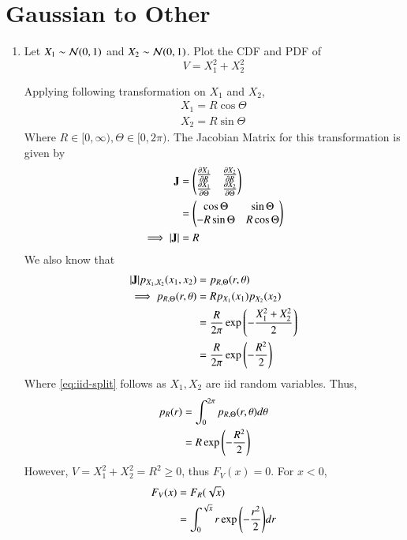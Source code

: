 \documentclass[journal,12pt,twocolumn]{IEEEtran}
\renewcommand\thesection{\arabic{section}}
\begin{document}
\section{Gaussian to Other}
%
\begin{enumerate}[label=\thesection.\arabic*,ref=\thesection.\theenumi]
%
\item Let $X_1 \sim  \mathcal{N}(0, 1)$ and $X_2 \sim  \mathcal{N}(0, 1)$. Plot the CDF and PDF of
%
\begin{equation}
V = X_1^2 + X_2^2
\end{equation}

\solution

Applying following transformation on $X_1$ and $X_2$,
\begin{align}
	X_1 = R\cos{\Theta} \\
	X_2 = R\sin{\Theta}
\end{align}
Where $R \in [0, \infty), \Theta \in [0, 2\pi)$. The Jacobian Matrix for this transformation is given by
		\begin{align}
			\mathbf{J} &= \begin{pmatrix}\frac{\partial X_1}{\partial R} & \frac{\partial X_2}{\partial R} \\
							 \frac{\partial X_1}{\partial \Theta} & \frac{\partial X_2}{\partial \Theta}\end{pmatrix} \\
					&= \begin{pmatrix}\cos{\Theta} & \sin{\Theta} \\
							  -R\sin{\Theta} & R\cos{\Theta}\end{pmatrix} \\
			\implies |\mathbf{J}| &= R
			\label{eq:Jacobian}
		\end{align}
We also know that
		\begin{align}
			|\mathbf{J}|p_{X_1, X_2}(x_1, x_2) &= p_{R, \Theta}(r, \theta) \\
			\implies p_{R, \Theta}(r, \theta) &= Rp_{X_1}(x_1)p_{X_2}(x_2) \label{eq:iid-split} \\
			&= \frac{R}{2\pi}\exp{\ensuremath{\left(-\frac{X_1^2 + X_2^2}{2}\right)}} \\
			&= \frac{R}{2\pi}\exp{\ensuremath{\left(-\frac{R^2}{2}\right)}}
			\label{eq:joint}
		\end{align}
Where \eqref{eq:iid-split} follows as $X_1, X_2$ are iid random variables. Thus,
		\begin{align}
			p_R(r) &= \int_{0}^{2\pi}p_{R, \Theta}(r, \theta)d\theta \\
			&= R\exp{\ensuremath{\left(-\frac{R^2}{2}\right)}}
		\end{align}
However, $V = X_1^2 + X_2^2 = R^2 \geq 0$, thus $F_V(x) = 0$. For $x < 0$,
		\begin{align}
			F_V(x) &= F_R(\sqrt{x}) \\ 
			&= \int_{0}^{\sqrt{x}}r\exp{\brak{-\frac{r^2}{2}}}dr \\

\end{align}
\end{enumerate}
\end{document}
